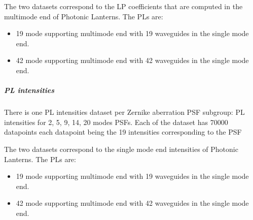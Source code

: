 			The two datasets correspond to the LP coefficients that are computed in the multimode end of Photonic Lanterns. The PLs are:
			\begin{itemize}
				\item 19 mode supporting multimode end with 19 waveguides in the single mode end.
				\item 42 mode supporting multimode end with 42 waveguides in the single mode end.
			\end{itemize}
			
		\subparagraph{PL intensities}
		
			There is one PL intensities dataset per Zernike aberration PSF subgroup: PL intensities for 2, 5, 9, 14, 20 modes PSFs. Each of the dataset has 70000 datapoints each datapoint being the 19 intensities corresponding to the PSF
			
			The two datasets correspond to the single mode end intensities of Photonic Lanterns. The PLs are:
			\begin{itemize}
				\item 19 mode supporting multimode end with 19 waveguides in the single mode end.
				\item 42 mode supporting multimode end with 42 waveguides in the single mode end.
			\end{itemize}

\finishday